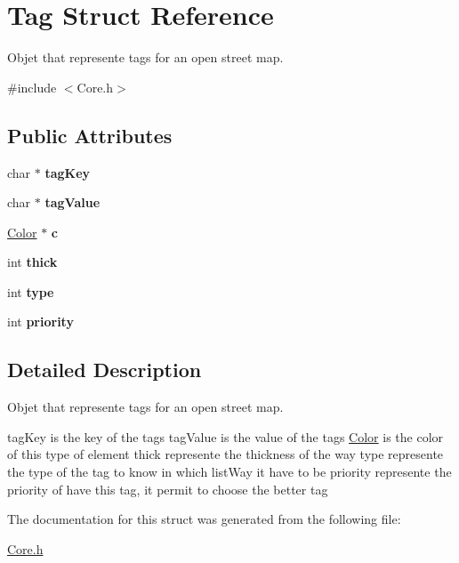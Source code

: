 \hypertarget{structTag}{\section{Tag Struct Reference}
\label{structTag}
}


Objet that represente tags for an open street map.  




{\ttfamily \#include $<$Core.\-h$>$}

\subsection*{Public Attributes}
\begin{DoxyCompactItemize}
\item 
\hypertarget{structTag_a9e91de69887dba3f1a2e9d532acbce8b}{char $\ast$ {\bfseries tag\-Key}}\label{structTag_a9e91de69887dba3f1a2e9d532acbce8b}

\item 
\hypertarget{structTag_ace008f9a4f15d8128de404a0c920ab0d}{char $\ast$ {\bfseries tag\-Value}}\label{structTag_ace008f9a4f15d8128de404a0c920ab0d}

\item 
\hypertarget{structTag_a6805504ea08ce816b95c5441f7485348}{\hyperlink{structColor}{Color} $\ast$ {\bfseries c}}\label{structTag_a6805504ea08ce816b95c5441f7485348}

\item 
\hypertarget{structTag_a6456de00a94753379709078b718a8724}{int {\bfseries thick}}\label{structTag_a6456de00a94753379709078b718a8724}

\item 
\hypertarget{structTag_acd71a132bb412efeccfbc87b3cc25787}{int {\bfseries type}}\label{structTag_acd71a132bb412efeccfbc87b3cc25787}

\item 
\hypertarget{structTag_af4bf844100277f4167d6cbe2d83d879d}{int {\bfseries priority}}\label{structTag_af4bf844100277f4167d6cbe2d83d879d}

\end{DoxyCompactItemize}


\subsection{Detailed Description}
Objet that represente tags for an open street map. 

tag\-Key is the key of the tags tag\-Value is the value of the tags \hyperlink{structColor}{Color} is the color of this type of element thick represente the thickness of the way type represente the type of the tag to know in which list\-Way it have to be priority represente the priority of have this tag, it permit to choose the better tag 

The documentation for this struct was generated from the following file\-:\begin{DoxyCompactItemize}
\item 
\hyperlink{Core_8h}{Core.\-h}\end{DoxyCompactItemize}
